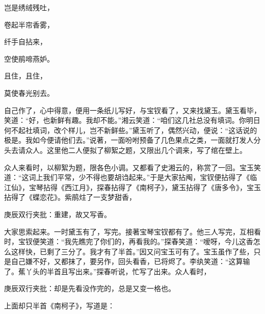 \begin{poem}
    \begin{pl}

        岂是绣绒残吐，
    \end{pl}
    \begin{pl}

        卷起半帘香雾，
    \end{pl}
    \begin{pl}

        纤手自拈来，
    \end{pl}
    \begin{pl}

        空使鹃啼燕妒。
    \end{pl}
    \begin{pl}

        且住，且住，
    \end{pl}
    \begin{pl}

        莫使春光别去。
    \end{pl}

\end{poem}


\begin{parag}
    自己作了，心中得意，便用一条纸儿写好，与宝钗看了，又来找黛玉。黛玉看毕，笑道：“好，也新鲜有趣。我却不能。”湘云笑道：“咱们这几社总没有填词。你明日何不起社填词，改个样儿，岂不新鲜些。”黛玉听了，偶然兴动，便说：“这话说的极是。我如今便请他们去。”说著，一面吩咐预备了几色果点之类，一面就打发人分头去请众人。这里他二人便拟了柳絮之题，又限出几个调来，写了绾在壁上。
\end{parag}


\begin{parag}
    众人来看时，以柳絮为题，限各色小调。又都看了史湘云的，称赏了一回。宝玉笑道：“这词上我们平常，少不得也要胡诌起来。”于是大家拈阄，宝钗便拈得了《临江仙》，宝琴拈得《西江月》，探春拈得了《南柯子》，黛玉拈得了《唐多令》，宝玉拈得了《蝶恋花》。紫鹃炷了一支梦甜香，\begin{note}庚辰双行夹批：重建，故又写香。\end{note}大家思索起来。一时黛玉有了，写完。接著宝琴宝钗都有了。他三人写完，互相看时，宝钗便笑道：“我先瞧完了你们的，再看我的。”探春笑道：“嗳呀，今儿这香怎么这样快，已剩了三分了。我才有了半首。”因又问宝玉可有了。宝玉虽作了些，只是自己嫌不好，又都抹了，要另作，回头看香，已将烬了。李纨笑道：“这算输了。蕉丫头的半首且写出来。”探春听说，忙写了出来。众人看时，\begin{note}庚辰双行夹批：却是先看没作完的，总是又变一格也。\end{note}上面却只半首《南柯子》，写道是：
\end{parag}


